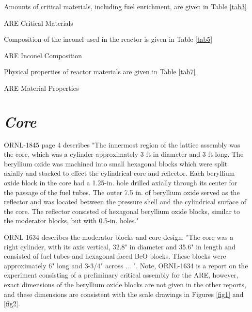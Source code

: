 \documentclass[ms,a4paper]{memoir}
\newcommand*{\msrarchive}{../../msr-archive}%
\begin{document}
Amounts of critical materials, including fuel enrichment, are given in Table \ref{tab3}

\begin{table}[H]
  \centering
  \caption{ARE Critical Materials \parencite[Appendix B.1]{ornl-1845}}
  \label{tab3}
\end{table}

Composition of the inconel used in the reactor is given in Table \ref{tab5}

\begin{table}[H]
  \centering
  \caption{ARE Inconel Composition \parencite[Appendix B.1]{ornl-1845}}
  \label{tab5}
\end{table}

Physical properties of reactor materials are given in Table \ref{tab7}

\begin{table}[H]
  \centering
  \caption{ARE Material Properties \parencite[Appendix B.3]{ornl-1845}}
  \label{tab7}
\end{table}

\section{\emph{Core}}

ORNL-1845 page 4 describes "The innermost region of the lattice assembly was the core, which was a cylinder approximately 3 ft in diameter and 3 ft long. The beryllium oxide was machined into small hexagonal blocks which were split axially and stacked to effect the cylindrical core and reflector. Each beryllium oxide block in the core had a 1.25-in. hole drilled axially through its center for the passage of the fuel tubes. The outer 7.5 in. of beryllium oxide served as the reflector and was located between the pressure shell and the cylindrical surface of the core. The reflector consisted of hexagonal beryllium oxide blocks, similar to the moderator blocks, but with 0.5-in. holes."

ORNL-1634 describes the moderator blocks and core design: "The core was a right cylinder, with its axis vertical, 32.8" in diameter and 35.6" in length and consisted of fuel tubes and hexagonal faced BeO blocks. These blocks were approximately 6" long and 3-3/4" across ... ". Note, ORNL-1634 is a report on the experiment consisting of a preliminary critical assembly for the ARE, however, exact dimensions of the beryllium oxide blocks are not given in the other reports, and these dimensions are consistent with the scale drawings in Figures \ref{fig1} and \ref{fig2}.
\end{document}
